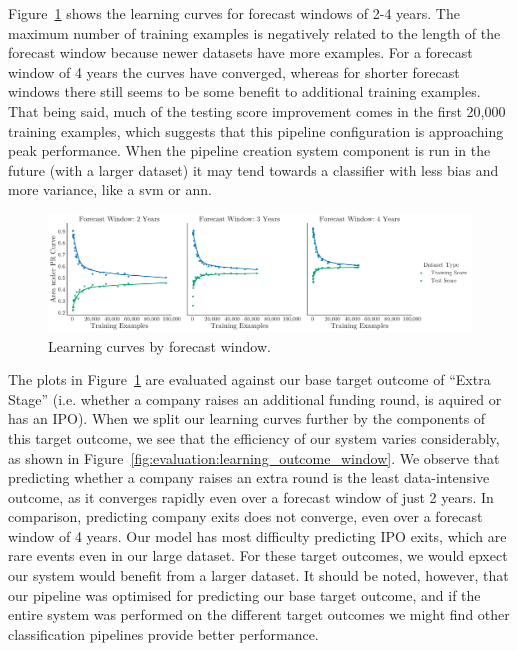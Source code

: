 \documentclass[../thesis/thesis.tex]{subfiles}
\begin{document}
Figure~\ref{fig:evaluation:learning_window} shows the learning curves for forecast windows of 2-4 years. The maximum number of training examples is negatively related to the length of the forecast window because newer datasets have more examples. For a forecast window of 4 years the curves have converged, whereas for shorter forecast windows there still seems to be some benefit to additional training examples. That being said, much of the testing score improvement comes in the first 20,000 training examples, which suggests that this pipeline configuration is approaching peak performance. When the pipeline creation system component is run in the future (with a larger dataset) it may tend towards a classifier with less bias and more variance, like a \gls{svm} or \gls{ann}.

\begin{figure}[!htb]
    \centering
    \includegraphics[width=\textwidth]{../figures/evaluation/learning_curves_window}
    \caption[Learning curves by forecast window]{Learning curves by forecast window.}
    \label{fig:evaluation:learning_window}
\end{figure}

The plots in Figure~\ref{fig:evaluation:learning_window} are evaluated against our base target outcome of ``Extra Stage'' (i.e. whether a company raises an additional funding round, is aquired or has an IPO). When we split our learning curves further by the components of this target outcome, we see that the efficiency of our system varies considerably, as shown in Figure~\ref{fig:evaluation:learning_outcome_window}. We observe that predicting whether a company raises an extra round is the least data-intensive outcome, as it converges rapidly even over a forecast window of just 2 years. In comparison, predicting company exits does not converge, even over a forecast window of 4 years. Our model has most difficulty predicting IPO exits, which are rare events even in our large dataset. For these target outcomes, we would epxect our system would benefit from a larger dataset. It should be noted, however, that our pipeline was optimised for predicting our base target outcome, and if the entire system was performed on the different target outcomes we might find other classification pipelines provide better performance.
\end{document}
